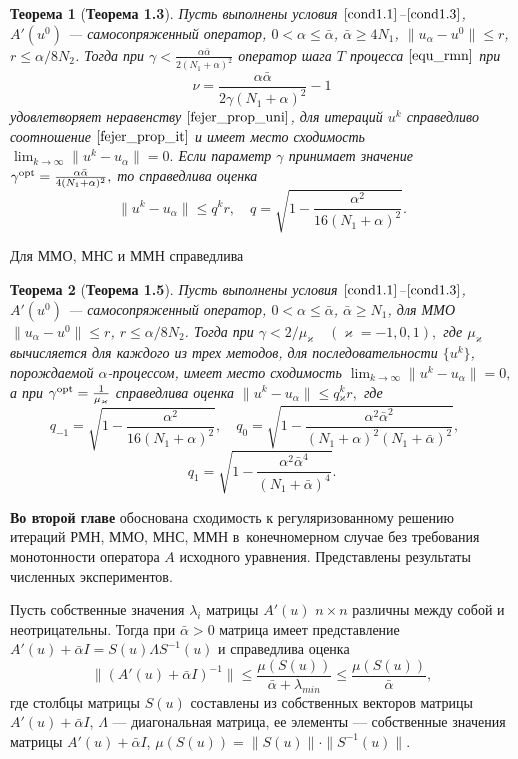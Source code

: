 \documentclass[%
autoref,     %
href,        %
colorlinks,  %
]{disser}
\newtheorem{theorem}{Теорема}
\begin{document}
\begin{theorem}[\textbf{Теорема 1.3}] \label{teo2.3}
	Пусть выполнены условия $\eqref{cond1.1}$--$\eqref{cond1.3}$, $A'(u^0)$ --- самосопряженный оператор, 
$0<\alpha\leqslant\bar\alpha$, $\bar\alpha\geqslant 4N_1$, $\|u_\alpha-u^0\|\leqslant r$, $r\leqslant\alpha/8N_2$. Тогда при
	$\gamma<\frac{\alpha\bar\alpha}{2(N_1+\alpha)^2}$
	оператор шага $T$ процесса $\eqref{equ_rmn}$ при
	$$\nu=\frac{\alpha\bar\alpha}{2\gamma(N_1+\alpha)^2}-1$$
	удовлетворяет неравенству $\eqref{fejer_prop_uni}$, для итераций $u^k$ справедливо соотношение $\eqref{fejer_prop_it}$ и имеет место сходимость
	$\lim_{k\to\infty}\|u^k-u_\alpha\|=0.$
	Если параметр $\gamma$ принимает значение ${\gamma}^{\textnormal{opt}}=\frac{\alpha\bar\alpha}{4(N_1+\alpha)^2},$ то справедлива оценка $$\|u^k-u_\alpha\|\leqslant q^k r, \quad q=\sqrt{1-\frac{{\alpha}^2}  {16(N_1+\alpha)^2}}.$$
\end{theorem}

Для ММО, МНС и ММН справедлива
\begin{theorem}[\textbf{Теорема 1.5}]\label{teo3.2}
	Пусть выполнены условия $\eqref{cond1.1}$--$\eqref{cond1.3}$, $A'(u^0)$ --- самосопряженный оператор, $0<\alpha \leqslant \bar\alpha$, $\bar\alpha \geqslant N_1$, для ММО $\|u_\alpha-u^0\|\leqslant r$, $r\leqslant \alpha/8N_2$.  Тогда при
	$\gamma<2/\mu _\varkappa\quad (\varkappa=-1,0,1),$
	где $\mu_\varkappa$ вычисляется для каждого из трех методов, для последовательности $\{u^k\}$, порождаемой $\alpha$-процессом, имеет место сходимость $\lim_{k\to\infty}\|u^k-u_\alpha\|=0, $ а при 
	$\gamma^{\textnormal{opt}}=\frac{1}{\mu_\varkappa}$
	справедлива оценка $\|u^k-u_\alpha\|\leqslant q{_\varkappa^k}r,$ где
	$$
	q_{-1}=\sqrt{1-\frac{\alpha^2}{16(N_1+\alpha)^2}}, \quad q_0=\sqrt{1-\frac{\alpha^2\bar\alpha^2}{(N_1+\alpha)^2(N_1+\bar\alpha)^2}}, \quad $$$$q_1=\sqrt{1-\frac{\alpha^2\bar\alpha^4}{(N_1+\bar\alpha)^4}}.
	$$
\end{theorem}

\textbf{Во второй главе} обоснована сходимость к регуляризованному решению итераций РМН, ММО, МНС, ММН в~конечномерном случае без требования монотонности оператора $A$ исходного уравнения. Представлены результаты численных экспериментов.

Пусть собственные значения $\lambda _i$ матрицы $A'(u)$ $n\times n$ различны между собой и неотрицательны. Тогда при $\bar\alpha>0$ матрица имеет представление $A'(u)+\bar\alpha I =S(u)\Lambda S^{-1}(u)$ и справедлива оценка
\begin{equation}\label{est4.1}
\|(A'(u)+\bar\alpha I)^{-1}\|\leqslant \frac{\mu (S(u))}{\bar\alpha+\lambda_{min}} \leqslant \frac{\mu(S(u))}{\bar\alpha},
\end{equation}
где столбцы матрицы $S(u)$ составлены из собственных векторов матрицы $A'(u)+\bar\alpha I$, $\Lambda$ --- диагональная матрица, ее элементы --- собственные значения матрицы $A'(u)+\bar\alpha I$, $\mu(S(u))=\|S(u)\|\cdot\|S^{-1}(u)\|$.
\end{document}

